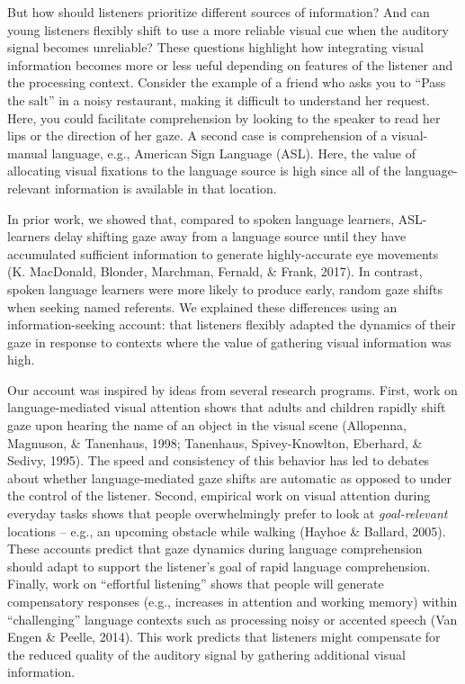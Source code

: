 \documentclass[10pt, letterpaper]{article}
\begin{document}
But how should listeners prioritize different sources of information?
And can young listeners flexibly shift to use a more reliable visual cue
when the auditory signal becomes unreliable? These questions highlight
how integrating visual information becomes more or less ueful depending
on features of the listener and the processing context. Consider the
example of a friend who asks you to ``Pass the salt'' in a noisy
restaurant, making it difficult to understand her request. Here, you
could facilitate comprehension by looking to the speaker to read her
lips or the direction of her gaze. A second case is comprehension of a
visual-manual language, e.g., American Sign Language (ASL). Here, the
value of allocating visual fixations to the language source is high
since all of the language-relevant information is available in that
location.

In prior work, we showed that, compared to spoken language learners,
ASL-learners delay shifting gaze away from a language source until they
have accumulated sufficient information to generate highly-accurate eye
movements (K. MacDonald, Blonder, Marchman, Fernald, \& Frank, 2017). In
contrast, spoken language learners were more likely to produce early,
random gaze shifts when seeking named referents. We explained these
differences using an information-seeking account: that listeners
flexibly adapted the dynamics of their gaze in response to contexts
where the value of gathering visual information was high.

Our account was inspired by ideas from several research programs. First,
work on language-mediated visual attention shows that adults and
children rapidly shift gaze upon hearing the name of an object in the
visual scene (Allopenna, Magnuson, \& Tanenhaus, 1998; Tanenhaus,
Spivey-Knowlton, Eberhard, \& Sedivy, 1995). The speed and consistency
of this behavior has led to debates about whether language-mediated gaze
shifts are automatic as opposed to under the control of the listener.
Second, empirical work on visual attention during everyday tasks shows
that people overwhelmingly prefer to look at \emph{goal-relevant}
locations -- e.g., an upcoming obstacle while walking (Hayhoe \&
Ballard, 2005). These accounts predict that gaze dynamics during
language comprehension should adapt to support the listener's goal of
rapid language comprehension. Finally, work on ``effortful listening''
shows that people will generate compensatory responses (e.g., increases
in attention and working memory) within ``challenging'' language
contexts such as processing noisy or accented speech (Van Engen \&
Peelle, 2014). This work predicts that listeners might compensate for
the reduced quality of the auditory signal by gathering additional
visual information.
\end{document}
